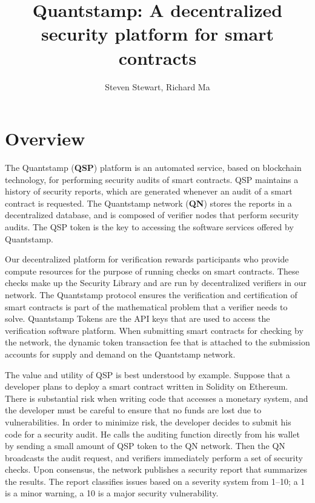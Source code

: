 \documentclass{llncs}
\begin{document}
\title{Quantstamp: A decentralized security platform for smart contracts}
\author{Steven Stewart, Richard Ma}
\maketitle

\section{Overview}
The Quantstamp ({\bfseries QSP}) platform is an automated service, based on blockchain technology, for performing security audits of smart contracts. QSP maintains a history of security reports, which are generated whenever an audit of a smart contract is requested. The Quantstamp network ({\bfseries QN}) stores the reports in a decentralized database, and is composed of verifier nodes that perform security audits. The QSP token is the key to accessing the software services offered by Quantstamp.

Our decentralized platform for verification rewards participants who provide compute resources for the purpose of running checks on smart contracts. These checks make up the Security Library and are run by decentralized verifiers in our network. The Quantstamp protocol ensures the verification and certification of smart contracts is part of the mathematical problem that a verifier needs to solve. Quantstamp Tokens are the API keys that are used to access the verification software platform. When submitting smart contracts for checking by the network, the dynamic token transaction fee that is attached to the submission accounts for supply and demand on the Quantstamp network. 

The value and utility of QSP is best understood by example. Suppose that a developer plans to deploy a smart contract written in Solidity on Ethereum. There is substantial risk when writing code that accesses a monetary system, and the developer must be careful to ensure that no funds are lost due to vulnerabilities. In order to minimize risk, the developer decides to submit his code for a security audit. He calls the auditing function directly from his wallet by sending a small amount of QSP token to the QN network. Then the QN broadcasts the audit request, and verifiers immediately perform a set of security checks. Upon consensus, the network publishes a security report that summarizes the results. The report classifies issues based on a severity system from 1--10; a 1 is a minor warning, a 10 is a major security vulnerability. 
\end{document}
